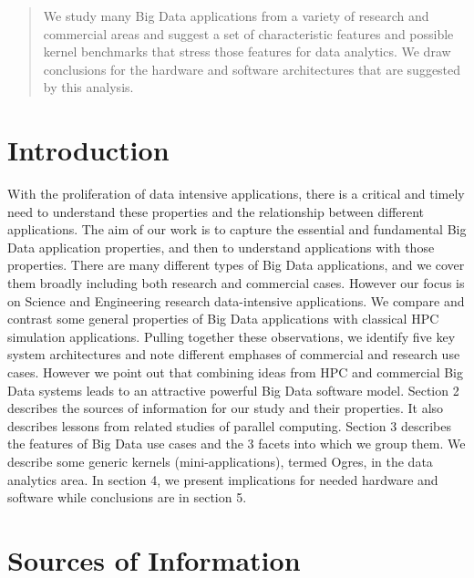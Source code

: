 \documentclass{acm_proc_article-sp}
\begin{document}
\maketitle
\begin{abstract}
We study many Big Data applications from a variety of research and commercial areas and suggest a set of characteristic features and possible kernel benchmarks that stress those features for data analytics. We draw conclusions for the hardware and software architectures that are suggested by this analysis.
\end{abstract}


\section{Introduction}
With the proliferation of data intensive applications, there is a critical and
timely need to understand these properties and the relationship between
different applications. The aim of our work is to capture the essential and
fundamental Big Data application properties, and then to understand
applications with those properties. There are many different types of Big Data
applications, and we cover them broadly including both research and commercial
cases. However our focus is on Science and Engineering research data-intensive
applications. We compare and contrast some general properties of Big Data
applications with classical HPC simulation applications. Pulling together these
observations, we identify five key system architectures and note different
emphases of commercial and research use cases. However we point out that
combining ideas from HPC and commercial Big Data systems leads to an attractive
powerful Big Data software model. Section 2 describes the sources of
information for our study and their properties. It also describes lessons from
related studies of parallel computing. Section 3 describes the features of Big
Data use cases and the 3 facets into which we group them. We describe some
generic kernels (mini-applications), termed Ogres, in the data analytics area.
In section 4, we present implications for needed hardware and software while
conclusions are in section 5.


\section{Sources of Information}
\end{document}
